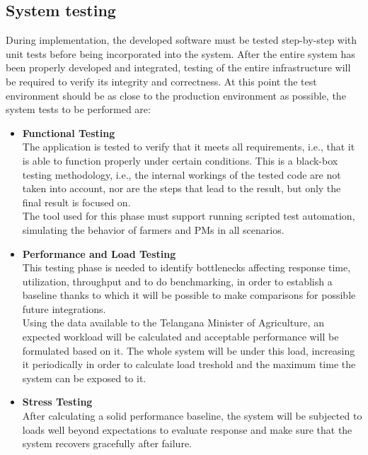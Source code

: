 \documentclass[10pt]{article} %
\begin{document}
\subsection{System testing}
During implementation, the developed software must be tested step-by-step with unit tests before 
being incorporated into the system. After the entire system has been properly developed and integrated, 
testing of the entire infrastructure will be required to verify its integrity and correctness. 
At this point the test environment should be as close to the production environment as possible, 
the system tests to be performed are:
\begin{itemize}
    \item \textbf{Functional Testing}\\The application is tested to verify that it meets all 
    requirements, i.e., that it is able to function properly under certain conditions. 
    This is a black-box testing methodology, i.e., the internal workings of the tested code 
    are not taken into account, nor are the steps that lead to the result, but only the final result is focused on.\\
    The tool used for this phase must support running scripted test automation, simulating the 
    behavior of farmers and PMs in all scenarios. %
    \item \textbf{Performance and Load Testing}\\This testing phase is needed to identify bottlenecks affecting response time, utilization,
    throughput and to do benchmarking, in order to establish a baseline thanks to which it will be 
    possible to make comparisons for possible future integrations.\\
    Using the data available to the Telangana Minister of Agriculture, an expected workload will be calculated 
    and acceptable performance will be formulated based on it. The whole system will be under this load, increasing it 
    periodically in order to calculate load treshold and the maximum time the system can be exposed to it. %
    \item \textbf{Stress Testing}\\After calculating a solid performance baseline, the system will be subjected to 
    loads well beyond expectations to evaluate response and make sure that the system recovers gracefully after failure.
\end{itemize}
\end{document}
